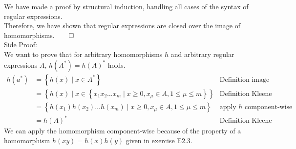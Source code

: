 We have made a proof by structural induction, handling all cases of the syntax of regular expressions.\\
Therefore, we have shown that regular expressions are closed over the image of homomorphisms.$\qed$ \\

\quad Side Proof:\\
We want to prove that for arbitrary homomorphisms $h$ and arbitrary regular expressions $A$, $h(A^{\ast}) = h(A)^{\ast}$ holds.\\
\begin{align*}
    h(a^{*}) &= \left\{h(x) \mid x \in A^{\ast} \right\} &\text{Definition image E2.3}\\
    &= \left\{h(x) \mid x \in \left\{ x_{1}x_{2}\ldots x_{m} \mid x\geq 0, x_{\mu} \in A, 1 \leq \mu \leq m \right\} \right\} &\text{Definition Kleene Closure}\\
    &= \left\{ h(x_{1})h(x_{2})\ldots h(x_{m}) \mid x\geq 0, x_{\mu} \in A, 1 \leq \mu \leq m \right\} &\text{apply }h\text{ component-wise}\\
    &= h(A)^{\ast} &\text{Definition Kleene Closure}
\end{align*}
We can apply the homomorphism component-wise because of the property of a homomorphism $h(xy)=h(x)h(y)$ given in exercise E2.3.\\


